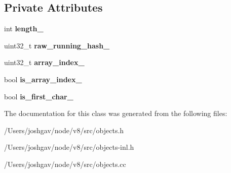 \subsection*{Private Attributes}
\begin{DoxyCompactItemize}
\item 
int {\bfseries length\+\_\+}\hypertarget{classv8_1_1internal_1_1_string_hasher_a3c6cef82b24f3dc5adf497741f848355}{}\label{classv8_1_1internal_1_1_string_hasher_a3c6cef82b24f3dc5adf497741f848355}

\item 
uint32\+\_\+t {\bfseries raw\+\_\+running\+\_\+hash\+\_\+}\hypertarget{classv8_1_1internal_1_1_string_hasher_ac37f252dc34c9e9da08e684ef94dee16}{}\label{classv8_1_1internal_1_1_string_hasher_ac37f252dc34c9e9da08e684ef94dee16}

\item 
uint32\+\_\+t {\bfseries array\+\_\+index\+\_\+}\hypertarget{classv8_1_1internal_1_1_string_hasher_a912c459c37fb3a54052dad6a4d309cbb}{}\label{classv8_1_1internal_1_1_string_hasher_a912c459c37fb3a54052dad6a4d309cbb}

\item 
bool {\bfseries is\+\_\+array\+\_\+index\+\_\+}\hypertarget{classv8_1_1internal_1_1_string_hasher_a24f8187b9e52ad1ff60a09c468ca128b}{}\label{classv8_1_1internal_1_1_string_hasher_a24f8187b9e52ad1ff60a09c468ca128b}

\item 
bool {\bfseries is\+\_\+first\+\_\+char\+\_\+}\hypertarget{classv8_1_1internal_1_1_string_hasher_a2cbe735fd351030a1512ac7dbc9afe2b}{}\label{classv8_1_1internal_1_1_string_hasher_a2cbe735fd351030a1512ac7dbc9afe2b}

\end{DoxyCompactItemize}


The documentation for this class was generated from the following files\+:\begin{DoxyCompactItemize}
\item 
/\+Users/joshgav/node/v8/src/objects.\+h\item 
/\+Users/joshgav/node/v8/src/objects-\/inl.\+h\item 
/\+Users/joshgav/node/v8/src/objects.\+cc\end{DoxyCompactItemize}
